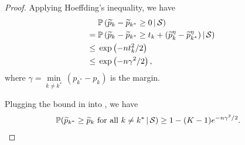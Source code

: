 \documentclass[letterpaper]{article} %
\newcommand{\Em}{{\mathbb{E}}}
\newcommand{\Pm}{{\mathbb{P}}}
\newcommand{\bp}{{\bm{p}}}
\newcommand{\by}{{\bm{y}}}
\newcommand{\be}{{\bm{e}}}
\newcommand{\T}{{\mathsf{T}}}
\newcommand{\gvn}{\,|\,}
\newcommand{\cS}{{\cal{S}}}
\newcommand{\argmax}{\mathrm{argmax}}
\begin{document}
\begin{proof}
    Applying Hoeffding's inequality, we have 
    \begin{align}
        &\; \Pm\left( \widetilde{p}_{k} - \widetilde{p}_{k^*} \geq 0 \gvn \cS\right) \\
        =&\; \Pm\left( \widetilde{p}_{k} - \widetilde{p}_{k^*} \geq t_{k} + (\widetilde{p}_{k}^{\eta} - \widetilde{p}_{k^*}^{\eta}) 
        \gvn \cS \right) \nonumber \\
        \leq&\; \exp\left( -nt_{k}^2/2 \right) \nonumber \\
        \leq&\; \exp\left( -n \gamma^{2}/2 \right), \label{eq:lower}
    \end{align}
    where $\gamma = \underset{k\ne k^*}{\min}\,(p_{k^*} - p_{k})$ is the margin.

    Plugging the bound in  into , we have
    \begin{align*}
        \Pm(\widetilde{p}_{k^*}\geq \widetilde{p}_{k} \text{ for all $k \neq k^{*}$}
        \gvn \cS) 
        &\geq 1-(K-1) e^{-n\gamma^2/2}.\qedhere
    \end{align*}
    
    
    


\end{proof}
\end{document}
